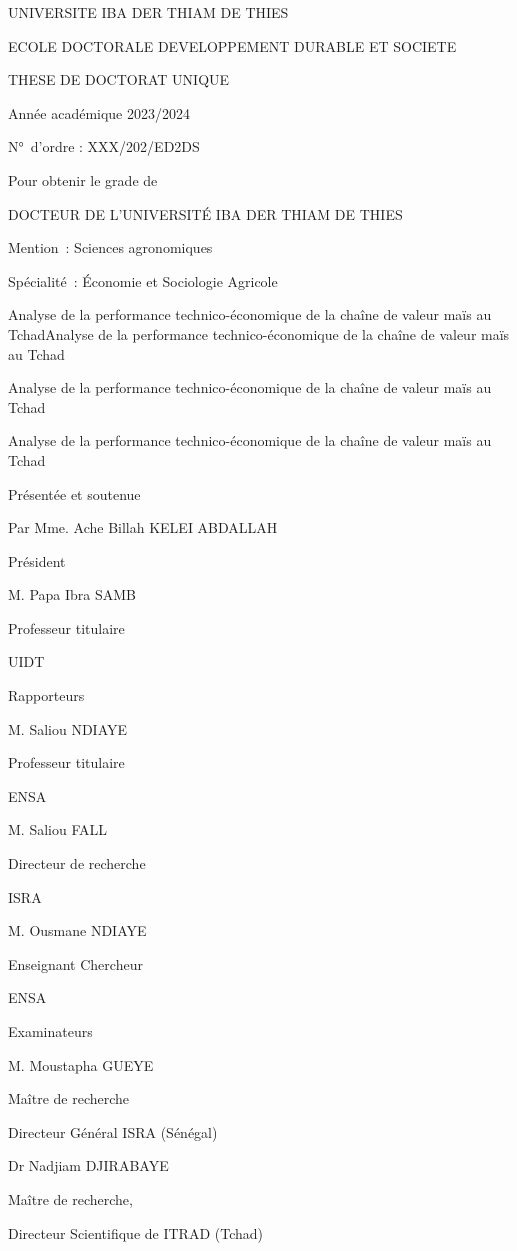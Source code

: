 \documentclass[12pt,oneside]{report}
\begin{document}

UNIVERSITE IBA DER THIAM DE THIES

ECOLE DOCTORALE DEVELOPPEMENT DURABLE ET SOCIETE

THESE DE DOCTORAT UNIQUE

Année académique 2023/2024

N° d’ordre : XXX/202/ED2DS

Pour obtenir le grade de

DOCTEUR DE L’UNIVERSITÉ IBA DER THIAM DE THIES

Mention : Sciences agronomiques

Spécialité : Économie et Sociologie Agricole

Analyse de la performance technico-économique de la chaîne de valeur maïs au TchadAnalyse de la performance technico-économique de la chaîne de valeur maïs au Tchad

Analyse de la performance technico-économique de la chaîne de valeur maïs au Tchad

Analyse de la performance technico-économique de la chaîne de valeur maïs au Tchad

Présentée et soutenue

Par Mme. Ache Billah KELEI ABDALLAH

Président

M. Papa Ibra SAMB

Professeur titulaire

UIDT

Rapporteurs

M. Saliou NDIAYE

Professeur titulaire

ENSA

M. Saliou FALL

Directeur de recherche

ISRA

M. Ousmane NDIAYE

Enseignant Chercheur

ENSA

Examinateurs

M. Moustapha GUEYE

Maître de recherche

Directeur Général ISRA (Sénégal)

Dr Nadjiam DJIRABAYE

Maître de recherche,

Directeur Scientifique de ITRAD (Tchad)
\end{document}
